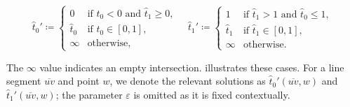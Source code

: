 \begin{equation}
  \hat{t}_0' \coloneq \begin{cases}
    0 & \text{if } \hat{t}_0 < 0 \text{ and } \hat{t}_1 \geq 0,\\
    \hat{t}_0 & \text{if } \hat{t}_0 \in [0, 1],\\
    \infty &\text{otherwise},
  \end{cases}
	\quad
  \hat{t}_1' \coloneq \begin{cases}
    1 & \text{if } \hat{t}_1 > 1 \text{ and } \hat{t}_0 \leq 1,\\
    \hat{t}_1 & \text{if } \hat{t}_1 \in [0, 1],\\
    \infty &\text{otherwise}.
  \end{cases}
\end{equation}

The \(\infty\) value indicates an empty intersection.  illustrates these cases. For a line segment \(\overline{uv}\) and point \(w\), we denote the relevant solutions as \(\hat t_0'(\overline{uv}, w)\) and \(\hat t_1'(\overline{uv}, w)\); the parameter \(\varepsilon\) is omitted as it is fixed contextually.

